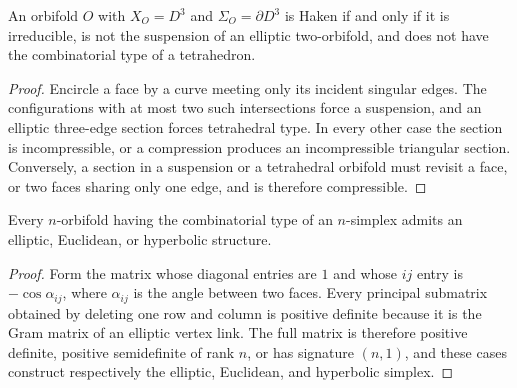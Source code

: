 \begin{proposition}
\label{thurston-ch13-tetrahedral-haken}

An orbifold $O$ with $X_O=D^3$ and $\Sigma_O=\partial D^3$ is Haken if and only
if it is irreducible, is not the suspension of an elliptic two-orbifold, and
does not have the combinatorial type of a tetrahedron.
\end{proposition}
\begin{proof}
\sketch Encircle a face by a curve meeting only its incident singular edges.
The configurations with at most two such intersections force a suspension,
and an elliptic three-edge section forces tetrahedral type.  In every other
case the section is incompressible, or a compression produces an
incompressible triangular section.  Conversely, a section in a suspension or
a tetrahedral orbifold must revisit a face, or two faces sharing only one edge,
and is therefore compressible.
\end{proof}

\begin{theorem}
\label{thurston-ch13-simplex-geometrization}

Every $n$-orbifold having the combinatorial type of an $n$-simplex admits an
elliptic, Euclidean, or hyperbolic structure.
\end{theorem}
\begin{proof}
\sketch Form the matrix whose diagonal entries are $1$ and whose $ij$ entry is
$-\cos\alpha_{ij}$, where $\alpha_{ij}$ is the angle between two faces.  Every
principal submatrix obtained by deleting one row and column is positive
definite because it is the Gram matrix of an elliptic vertex link.  The full
matrix is therefore positive definite, positive semidefinite of rank $n$, or
has signature $(n,1)$, and these cases construct respectively the elliptic,
Euclidean, and hyperbolic simplex.
\end{proof}

